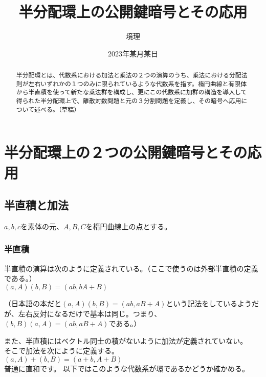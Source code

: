\documentclass[
]{article}
\title{半分配環上の公開鍵暗号とその応用}
\author{境理}
\date{2023年某月某日}
\begin{document}
\maketitle
\begin{abstract}
半分配環とは、代数系における加法と乗法の２つの演算のうち、乗法における分配法則が左右いずれかの１つのみに限られているような代数系を指す。楕円曲線と有限体から半直積を使って新たな乗法群を構成し、更にこの代数系に加群の構造を導入して得られた半分配環上で、離散対数問題と元の３分割問題を定義し、その暗号へ応用について述べる。（草稿）
\end{abstract}

\hypertarget{ux534aux5206ux914dux74b0ux4e0aux306euxff12ux3064ux306eux516cux958bux9375ux6697ux53f7ux3068ux305dux306eux5fdcux7528}{%
\section{半分配環上の２つの公開鍵暗号とその応用}\label{ux534aux5206ux914dux74b0ux4e0aux306euxff12ux3064ux306eux516cux958bux9375ux6697ux53f7ux3068ux305dux306eux5fdcux7528}}

\hypertarget{ux534aux76f4ux7a4dux3068ux52a0ux6cd5}{%
\subsection{半直積と加法}\label{ux534aux76f4ux7a4dux3068ux52a0ux6cd5}}

\(a,b,c\)を素体の元、\(A,B,C\)を楕円曲線上の点とする。

\hypertarget{ux534aux76f4ux7a4d}{%
\subsubsection{半直積}\label{ux534aux76f4ux7a4d}}

半直積の演算は次のように定義されている。（ここで使うのは外部半直積の定義である。）\\
\((a,A)(b,B)=(ab,bA+B)\)

（日本語の本だと\((a,A)(b,B)=(ab,aB+A)\)という記法をしているようだが、左右反対になるだけで基本は同じ。つまり、\((b,B)(a,A)=(ab,aB+A)\)である。）

また、半直積にはベクトル同士の積がないように加法が定義されていない。\\
そこで加法を次にように定義する。\\
\((a,A)+(b,B)=(a+b,A+B)\)\\
普通に直和です。 以下ではこのような代数系が環であるかどうか確かめる。
\end{document}
